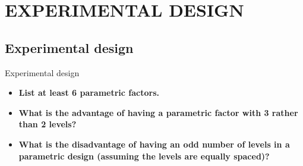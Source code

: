 \documentclass{beamer}
\begin{document}


\section{EXPERIMENTAL DESIGN}


\subsection[Experimental design]{Experimental design}


\begin{frame}{Experimental design}
  \begin{itemize}  
    \item \textbf{List at least 6 parametric factors.}


    \bigskip
    \item \textbf{What is the advantage of having a parametric factor with 3 rather than 2 levels?}


    \bigskip
    \item \textbf{What is the disadvantage of having an odd number of levels in a parametric design (assuming the levels are equally spaced)?}

  \end{itemize}
\end{frame}




% 
\end{document}

